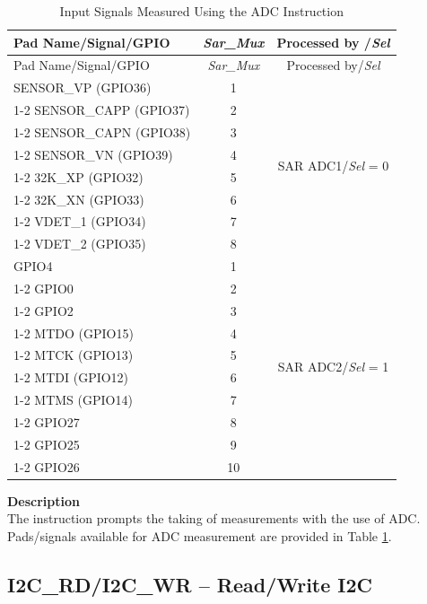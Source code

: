 \documentclass[main\_\_EN.tex]{subfiles}
\begin{document}
\begin{longtable}{ |l|c|c| }
    \caption{Input Signals Measured Using the ADC Instruction}
    \label{table:adc inputs1}
    \\\hline
    \rowcolor{lightgray}
    Pad Name/Signal/GPIO \ & \textit{Sar\_Mux} & Processed by /\textit{Sel} \\\hline
    \endfirsthead
    \hline
    \rowcolor{lightgray}
    Pad Name/Signal/GPIO \ & \textit{Sar\_Mux} & Processed by/\textit{Sel} \\\hline
    \endhead
    \hline
    \endfoot
    SENSOR\_VP (GPIO36)    &  1  & \multirow{8}{*}{SAR ADC1/\textit{Sel} = 0} \\ \cline{1-2}
    SENSOR\_CAPP (GPIO37)  &  2  & \\ \cline{1-2}
    SENSOR\_CAPN (GPIO38)  &  3  & \\ \cline{1-2}
    SENSOR\_VN (GPIO39)    &  4  & \\ \cline{1-2}
    32K\_XP (GPIO32)       &  5  & \\ \cline{1-2}
    32K\_XN (GPIO33)       &  6  & \\ \cline{1-2}
    VDET\_1 (GPIO34)       &  7  & \\ \cline{1-2}
    VDET\_2 (GPIO35)       &  8  & \\ \hline
    GPIO4                  &  1  & \multirow{10}{*}{SAR ADC2/\textit{Sel} = 1} \\ \cline{1-2}
    GPIO0                  &  2  & \\ \cline{1-2}
    GPIO2                  &  3  & \\ \cline{1-2}
    MTDO (GPIO15)          &  4  & \\ \cline{1-2}
    MTCK (GPIO13)          &  5  & \\ \cline{1-2}
    MTDI (GPIO12)          &  6  & \\ \cline{1-2}
    MTMS (GPIO14)          &  7  & \\ \cline{1-2}
    GPIO27                 &  8  & \\ \cline{1-2}
    GPIO25                 &  9  & \\ \cline{1-2}
    GPIO26                 &  10  &
\end{longtable}
\textbf{Description} \\
The instruction prompts the taking of measurements with the use of ADC. Pads/signals available for ADC measurement are provided in Table \ref{table:adc inputs1}.

\subsection{I2C\_RD/I2C\_WR – Read/Write I2C} \label{subsection:I2C}
\end{document}
